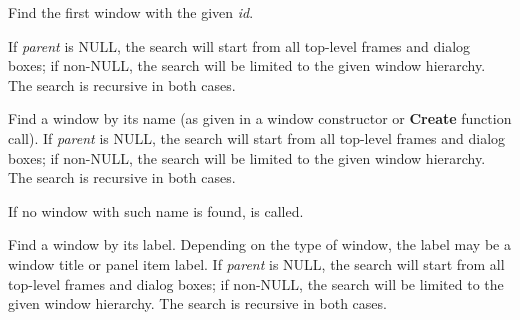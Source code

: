 

\label{wxwindowfindwindowbyid}


Find the first window with the given {\it id}.

If {\it parent} is NULL, the search will start from all top-level
frames and dialog boxes; if non-NULL, the search will be limited to the given window hierarchy.
The search is recursive in both cases.




\label{wxwindowfindwindowbyname}


Find a window by its name (as given in a window constructor or {\bf Create} function call).
If {\it parent} is NULL, the search will start from all top-level
frames and dialog boxes; if non-NULL, the search will be limited to the given window hierarchy.
The search is recursive in both cases.

If no window with such name is found,
 is called.




\label{wxwindowfindwindowbylabel}


Find a window by its label. Depending on the type of window, the label may be a window title
or panel item label. If {\it parent} is NULL, the search will start from all top-level
frames and dialog boxes; if non-NULL, the search will be limited to the given window hierarchy.
The search is recursive in both cases.

